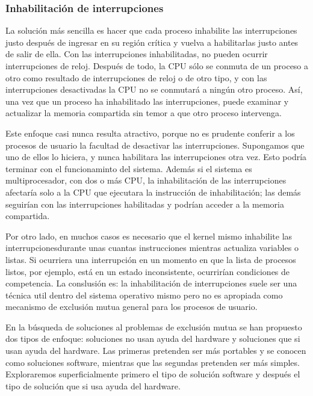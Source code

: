 \documentclass{article}
\begin{document}
\subsubsection*{Inhabilitaci\'on de interrupciones}
La soluci\'on m\'as sencilla es hacer que cada proceso inhabilite las 
interrupciones justo despu\'es de ingresar en su regi\'on cr\'itica 
y vuelva a habilitarlas justo antes de salir de ella. Con las 
interrupciones inhabilitadas, no pueden ocurrir interrupciones de reloj. 
Despu\'es de todo, la CPU s\'olo se conmuta de un proceso a otro como 
resultado de interrupciones de reloj o de otro tipo, y con las 
interrupciones desactivadas la CPU no se conmutar\'a a ning\'un otro 
proceso. As\'i, una vez que un proceso ha inhabilitado las 
interrupciones, puede examinar y actualizar la memoria compartida sin 
temor a que otro proceso intervenga.

Este enfoque casi nunca resulta atractivo, porque no es prudente 
conferir a los procesos de usuario la facultad de desactivar las 
interrupciones. Supongamos que uno de ellos lo hiciera, y nunca 
habilitara las interrupciones otra vez. Esto podr\'ia terminar con 
el funcionaminto del sistema. Adem\'as si el sistema es multiprocesador, 
con dos o m\'as CPU, la inhabilitaci\'on de las interrupciones 
afectar\'ia solo a la CPU que ejecutara la instrucci\'on de 
inhabilitaci\'on; las dem\'as seguir\'ian con las interrupciones 
habilitadas y podr\'ian acceder a la memoria compartida.

Por otro lado, en muchos casos es necesario que el kernel mismo 
inhabilite las interrupcionesdurante unas cuantas instrucciones 
mientras actualiza variables o listas. Si ocurriera una interrupci\'on 
en un momento en que la lista de procesos listos, por ejemplo, est\'a 
en un estado inconsistente, ocurrir\'ian condiciones de competencia. 
La conslusi\'on es: la inhabilitaci\'on de interrupciones suele ser 
una t\'ecnica util dentro del sistema operativo mismo pero no es 
apropiada como mecanismo de exclusi\'on mutua general para los 
procesos de usuario.

En la b\'usqueda de soluciones al problemas de exclusi\'on mutua se 
han propuesto dos tipos de enfoque: soluciones no usan ayuda del 
hardware y soluciones que si usan ayuda del hardware. Las primeras 
pretenden ser m\'as portables y se conocen como soluciones software, 
mientras que las segundas pretenden ser m\'as simples. Exploraremos 
superf\/icialmente primero el tipo de soluci\'on software y despu\'es 
el tipo de soluci\'on que si usa ayuda del hardware.
\end{document}
